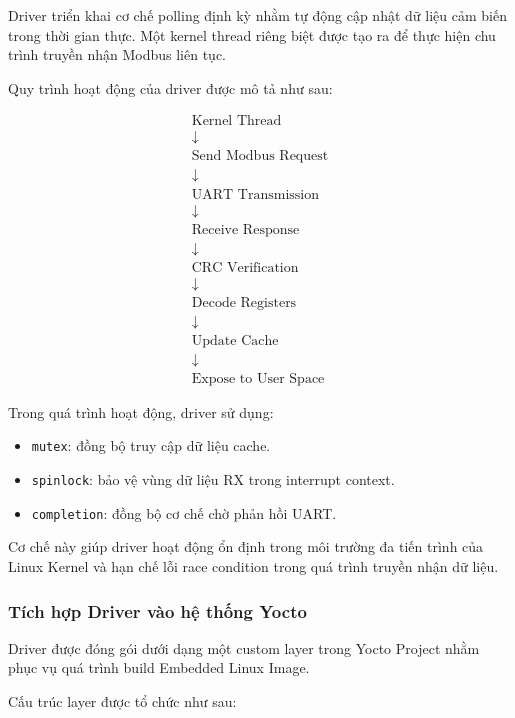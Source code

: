 Driver triển khai cơ chế polling định kỳ nhằm tự động cập nhật dữ liệu cảm biến trong thời gian thực. Một kernel thread riêng biệt được tạo ra để thực hiện chu trình truyền nhận Modbus liên tục.

Quy trình hoạt động của driver được mô tả như sau:

\[
\begin{array}{c}
\text{Kernel Thread} \\
\downarrow \\
\text{Send Modbus Request} \\
\downarrow \\
\text{UART Transmission} \\
\downarrow \\
\text{Receive Response} \\
\downarrow \\
\text{CRC Verification} \\
\downarrow \\
\text{Decode Registers} \\
\downarrow \\
\text{Update Cache} \\
\downarrow \\
\text{Expose to User Space}
\end{array}
\]

Trong quá trình hoạt động, driver sử dụng:
\begin{itemize}
    \item \texttt{mutex}: đồng bộ truy cập dữ liệu cache.
    
    \item \texttt{spinlock}: bảo vệ vùng dữ liệu RX trong interrupt context.
    
    \item \texttt{completion}: đồng bộ cơ chế chờ phản hồi UART.
\end{itemize}

Cơ chế này giúp driver hoạt động ổn định trong môi trường đa tiến trình của Linux Kernel và hạn chế lỗi race condition trong quá trình truyền nhận dữ liệu.

\subsubsection{Tích hợp Driver vào hệ thống Yocto}

Driver được đóng gói dưới dạng một custom layer trong Yocto Project nhằm phục vụ quá trình build Embedded Linux Image.

Cấu trúc layer được tổ chức như sau:

